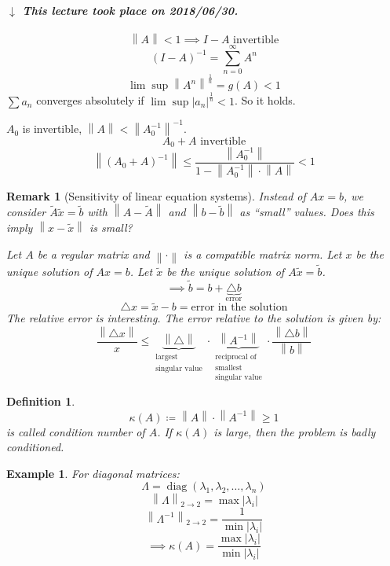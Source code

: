 \documentclass{article}
\newcounter{lecref}[section]
\numberwithin{lecref}{section}
\newtheorem{example}[lecref]{Example}
\newtheorem{definition}[lecref]{Definition}
\newtheorem{remark}[lecref]{Remark}
\newcommand{\norm}[1]{\left\|#1\right\|}
\newcommand{\card}[1]{\left|#1\right|}
\newcommand{\dateref}[1]{%
  \begin{mdframed}[backgroundcolor=gray!10,innerbottommargin=0pt,innertopmargin=0pt]
    \paragraph{\textit{$\downarrow$ This lecture took place on #1.}}%
  \end{mdframed}%
}
\begin{document}
\dateref{2018/06/30}

\[ \norm{A} < 1 \implies I-A \text{ invertible} \]
\[ (I - A)^{-1} = \sum_{n=0}^\infty A^n \]
\[ \lim\sup \norm{A^n}^{\frac1n} = g(A) < 1 \]
$\sum a_n$ converges absolutely if $\lim\sup{\card{a_n}^{\frac1n}} < 1$. So it holds.

$A_0$ is invertible, $\norm{A} < \norm{A_0^{-1}}^{-1}$.
\[ A_0 + A \text{ invertible} \]
\[ \norm{(A_0 + A)^{-1}} \leq \frac{\norm{A_0^{-1}}}{1 - \norm{A_0^{-1}} \cdot \norm{A}} < 1 \]

\begin{remark}[Sensitivity of linear equation systems] %
  \label{rem:sens}
  Instead of $Ax = b$, we consider $\tilde A \tilde x = \tilde b$
  with $\norm{A - \tilde A}$ and $\norm{b - \tilde b}$ as \enquote{small} values.
  Does this imply $\norm{x - \tilde x}$ is small?

  Let $A$ be a regular matrix and $\norm{\cdot}$ is a compatible matrix norm.
  Let $x$ be the unique solution of $Ax = b$.
  Let $\tilde x$ be the unique solution of $A \tilde x = \tilde b$.
  \[ \implies \tilde b = b + \underbrace{\triangle b}_{\text{error}} \]
  \[ \triangle x = \tilde x - b = \text{error in the solution} \]
  The relative error is interesting.
  The error relative to the solution is given by:
  \[ \frac{\norm{\triangle x}}{x} \leq \underbrace{\norm{\triangle}}_{\substack{\text{largest} \\ \text{singular value}}} \cdot \underbrace{\norm{A^{-1}}}_{\substack{\text{reciprocal of} \\ \text{smallest} \\ \text{singular value}}} \cdot \frac{\norm{\triangle b}}{\norm{b}} \]
\end{remark}

\begin{definition} %
  \[ \kappa(A) \coloneqq \norm{A} \cdot \norm{A^{-1}} \geq 1 \]
  is called \emph{condition number of $A$}.
  If $\kappa(A)$ is large, then the problem is badly conditioned.
\end{definition}

\begin{example} %
  For diagonal matrices:
  \[ \Lambda = \operatorname{diag}(\lambda_1, \lambda_2, \dots, \lambda_n) \]
  \[ \norm{\Lambda}_{2 \to 2} = \max\card{\lambda_i} \]
  \[ \norm{\Lambda^{-1}}_{2 \to 2} = \frac{1}{\min\card{\lambda_i}} \]
  \[ \implies \kappa(A) = \frac{\max\card{\lambda_i}}{\min\card{\lambda_i}} \]
\end{example}
\end{document}

